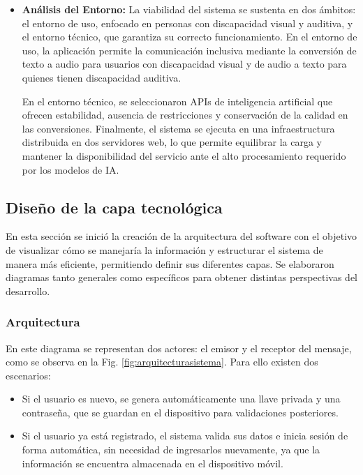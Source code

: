 \documentclass[lettersize,journal]{IEEEtran}
\begin{document}
\begin{itemize}
	\item \textbf{Análisis del Entorno:} 
	\noindent La viabilidad del sistema se sustenta en dos ámbitos: el entorno de uso, enfocado en personas con discapacidad visual y auditiva, y el entorno técnico, que garantiza su correcto funcionamiento. En el entorno de uso, la aplicación permite la comunicación inclusiva mediante la conversión de texto a audio para usuarios con discapacidad visual y de audio a texto para quienes tienen discapacidad auditiva.
	
	\noindent En el entorno técnico, se seleccionaron APIs de inteligencia artificial que ofrecen estabilidad, ausencia de restricciones y conservación de la calidad en las conversiones. Finalmente, el sistema se ejecuta en una infraestructura distribuida en dos servidores web, lo que permite equilibrar la carga y mantener la disponibilidad del servicio ante el alto procesamiento requerido por los modelos de IA.


\end{itemize}

\subsection {Diseño de la capa tecnológica}

\noindent En esta sección se inició la creación de la arquitectura del software con el objetivo de visualizar cómo se manejaría la información y estructurar el sistema de manera más eficiente, permitiendo definir sus diferentes capas. Se elaboraron diagramas tanto generales como específicos para obtener distintas perspectivas del desarrollo.

\subsubsection {Arquitectura}

En este diagrama se representan dos actores: el emisor y el receptor del mensaje, como se observa en la Fig. \ref{fig:arquitecturasistema}. Para ello existen dos escenarios:

\begin{itemize}
	\item Si el usuario es nuevo, se genera automáticamente una llave privada y una contraseña, que se guardan en el dispositivo para validaciones posteriores.
	
	\item Si el usuario ya está registrado, el sistema valida sus datos e inicia sesión de forma automática, sin necesidad de ingresarlos nuevamente, ya que la información se encuentra almacenada en el dispositivo móvil.
\end{itemize}
\end{document}
